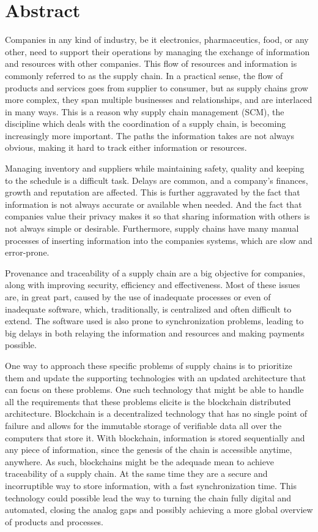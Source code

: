 \chapter{Abstract}
Companies in any kind of industry, be it electronics, pharmaceutics, food, or any other, need to support their operations by managing the exchange of information and resources with other companies. This flow of resources and information is commonly referred to as the supply chain. In a practical sense, the flow of products and services goes from supplier to consumer, but as supply chains grow more complex, they span multiple businesses and relationships, and are interlaced in many ways. This is a reason why supply chain management (SCM), the discipline which deals with the coordination of a supply chain, is becoming increasingly more important. The paths the information takes are not always obvious, making it hard to track either information or resources.

Managing inventory and suppliers while maintaining safety, quality and keeping to the schedule is a difficult task. Delays are common, and a company’s finances, growth and reputation are affected. This is further aggravated by the fact that information is not always accurate or available when needed. And the fact that companies value their privacy makes it so that sharing information with others is not always simple or desirable. Furthermore, supply chains have many manual processes of inserting information into the companies systems, which are slow and error-prone.

Provenance and traceability of a supply chain are a big objective for companies, along with improving security, efficiency and effectiveness. Most of these issues are, in great part, caused by the use of inadequate processes or even of inadequate software, which, traditionally, is centralized and often difficult to extend. The software used is also prone to synchronization problems, leading to big delays in both relaying the information and resources and making payments possible. 

One way to approach these specific problems of supply chains is to prioritize them and update the supporting technologies with an updated architecture that can focus on these problems. One such technology that might be able to handle all the requirements that these problems elicite is the blockchain distributed architecture. Blockchain is a decentralized technology that has no single point of failure and allows for the immutable storage of verifiable data all over the computers that store it. With blockchain, information is stored sequentially and any piece of information, since the genesis of the chain is accessible anytime, anywhere. As such, blockchains might be the adequade mean to achieve traceability of a supply chain. At the same time they are a secure and incorruptible way to store information, with a fast synchronization time. This technology could possible lead the way to turning the chain fully digital and automated, closing the analog gaps and possibly achieving a more global overview of products and processes.

